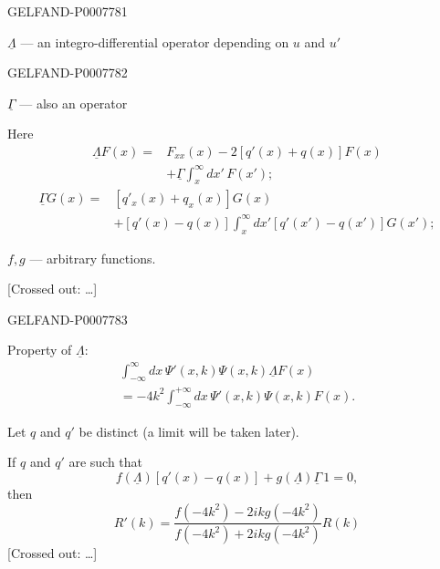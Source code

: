 \begin{GelfandAdjacentEvidence}{GELFAND-P000778}{1}

\(\underline\Lambda\) --- an integro-differential operator depending on \(u\) and \(u'\)
\end{GelfandAdjacentEvidence}
\begin{GelfandAdjacentEvidence}{GELFAND-P000778}{2}


\(\underline\Gamma\) --- also an operator

Here
\begin{equation}
\begin{split}
\underline\Lambda F(x)={}&F_{xx}(x)-2[q'(x)+q(x)]F(x)\\
&+\underline\Gamma\int_x^\infty dx'\,F(x');
\end{split}\tag{7}
\end{equation}
\begin{equation}
\begin{split}
\underline\Gamma G(x)={}&[q'_x(x)+q_x(x)]G(x)\\
&+[q'(x)-q(x)]\int_x^\infty dx'[q'(x')-q(x')]G(x');
\end{split}\tag{8}
\end{equation}

\(f,g\) --- arbitrary functions.

[Crossed out: …]
\end{GelfandAdjacentEvidence}
\begin{GelfandAdjacentEvidence}{GELFAND-P000778}{3}

Property of \(\underline\Lambda\):
\begin{multline}
\int_{-\infty}^\infty dx\,\Psi'(x,k)\Psi(x,k)\underline\Lambda F(x)\\
=-4k^2\int_{-\infty}^{+\infty}dx\,\Psi'(x,k)\Psi(x,k)F(x).\tag{9}
\end{multline}

Let \(q\) and \(q'\) be distinct (a limit will be taken later).

If \(q\) and \(q'\) are such that
\begin{equation}
f(\underline\Lambda)[q'(x)-q(x)]+g(\underline\Lambda)\underline\Gamma\,1=0,\tag{10}
\end{equation}
then
\begin{equation}
R'(k)=\frac{f(-4k^2)-2ikg(-4k^2)}{f(-4k^2)+2ikg(-4k^2)}R(k)\tag{11}
\end{equation}
[Crossed out: …]
\end{GelfandAdjacentEvidence}
